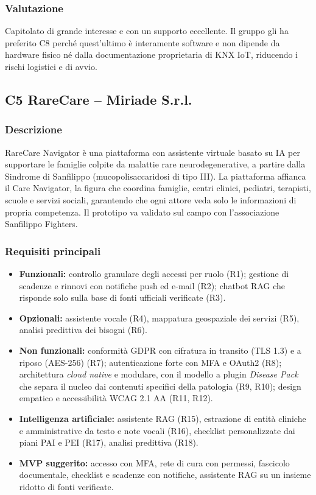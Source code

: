 \subsubsection*{Valutazione}

Capitolato di grande interesse e con un supporto eccellente. Il gruppo gli ha preferito C8 perché quest'ultimo è interamente software e non dipende da hardware fisico né dalla documentazione proprietaria di KNX IoT, riducendo i rischi logistici e di avvio.

\subsection{C5 RareCare -- Miriade S.r.l.}

\subsubsection*{Descrizione}

RareCare Navigator è una piattaforma con assistente virtuale basato su IA per supportare le famiglie colpite da malattie rare neurodegenerative, a partire dalla Sindrome di Sanfilippo (mucopolisaccaridosi di tipo III). La piattaforma affianca il Care Navigator, la figura che coordina famiglie, centri clinici, pediatri, terapisti, scuole e servizi sociali, garantendo che ogni attore veda solo le informazioni di propria competenza. Il prototipo va validato sul campo con l'associazione Sanfilippo Fighters.

\subsubsection*{Requisiti principali}

\begin{itemize}
    \item \textbf{Funzionali:} controllo granulare degli accessi per ruolo (R1); gestione di scadenze e rinnovi con notifiche push ed e-mail (R2); chatbot RAG che risponde solo sulla base di fonti ufficiali verificate (R3).
    \item \textbf{Opzionali:} assistente vocale (R4), mappatura geospaziale dei servizi (R5), analisi predittiva dei bisogni (R6).
    \item \textbf{Non funzionali:} conformità GDPR con cifratura in transito (TLS 1.3) e a riposo (AES-256) (R7); autenticazione forte con MFA e OAuth2 (R8); architettura \emph{cloud native} e modulare, con il modello a plugin \emph{Disease Pack} che separa il nucleo dai contenuti specifici della patologia (R9, R10); design empatico e accessibilità WCAG 2.1 AA (R11, R12).
    \item \textbf{Intelligenza artificiale:} assistente RAG (R15), estrazione di entità cliniche e amministrative da testo e note vocali (R16), checklist personalizzate dai piani PAI e PEI (R17), analisi predittiva (R18).
    \item \textbf{MVP suggerito:} accesso con MFA, rete di cura con permessi, fascicolo documentale, checklist e scadenze con notifiche, assistente RAG su un insieme ridotto di fonti verificate.
\end{itemize}

